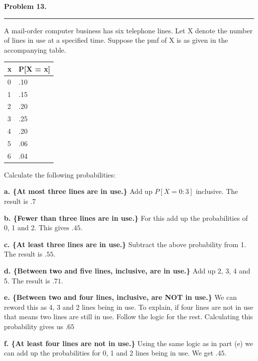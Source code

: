 \textbf{Problem 13.} \\
\hrule 

A mail-order computer business has six telephone lines. Let X denote the number of lines in use at a specified time. Suppose the pmf of X is as given in the accompanying table.

\begin{table}[h]
\begin{tabular}{@{}ll@{}}
\toprule
x & P[X = x] \\ \midrule
0 & .10 \\
1 & .15 \\
2 & .20 \\
3 & .25 \\
4 & .20 \\
5 & .06 \\
6 & .04 \\ \bottomrule
\end{tabular}
\end{table}

Calculate the following probabilities:

\textbf{a. \{At most three lines are in use.\}} \newline 
Add up $P[X = 0:3]$ inclusive. The result is $\boxed{.7}$

\textbf{b. \{Fewer than three lines are in use.\}} \newline 
For this add up the probabilities of 0, 1 and 2. This gives $\boxed{.45}$.

\textbf{c. \{At least three lines are in use.\}} \newline 
Subtract the above probability from 1. The result is $\boxed{.55}$.

\textbf{d. \{Between two and five lines, inclusive, are in use.\}} \newline 
Add up 2, 3, 4 and 5. The result is $\boxed{.71}$.

\textbf{e. \{Between two and four lines, inclusive, are NOT in use.\}} \newline 
We can reword this as 4, 3 and 2 lines being in use. To explain, if four lines are not in use that means two lines are still in use. Follow the logic for the rest. Calculating this probability gives us $\boxed{.65}$

\textbf{f. \{At least four lines are not in use.\}} \newline 
Using the same logic as in part (e) we can add up the probabilities for 0, 1 and 2 lines being in use. We get $\boxed{.45}$.